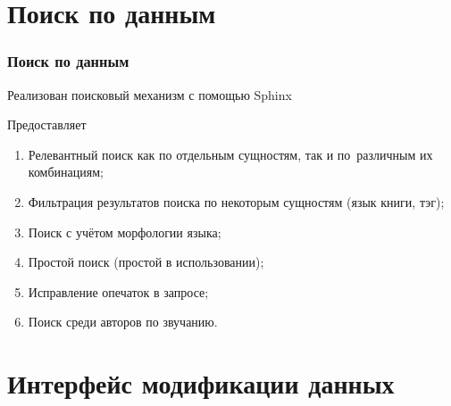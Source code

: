 \documentclass[utf8,handout]{beamer}
\begin{document}
\section{Поиск по данным}
	\begin{frame}
 		\frametitle{Поиск по данным}
 		Реализован поисковый механизм с помощью Sphinx
 		\begin{block}{}
			Предоставляет
			\begin{enumerate}
				\item  Релевантный поиск как по отдельным сущностям, так и по~различным их комбинациям;
				\item  Фильтрация результатов поиска по некоторым сущностям (язык книги, тэг);
				\item  Поиск с учётом морфологии языка;
				\item  Простой поиск (простой в использовании);
				\item  Исправление опечаток в запросе;
				\item  Поиск среди авторов по звучанию.
			\end{enumerate}
		\end{block}
	\end{frame}
	
\section{Интерфейс модификации данных}
\end{document}
